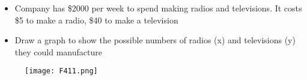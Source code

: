 \begin{frame}
\begin{itemize}
   \item Company has \$2000 per week to spend making radios and televisions. It costs \$5 to make a radio, \$40 to make a television
   \item Draw a graph to show the possible numbers of radios (x) and televisions (y)  they could manufacture
\end{itemize}
 \begin{figure}
    \centering
    \texttt{[image: F411.png]} %
  \end{figure}
\end{frame}

